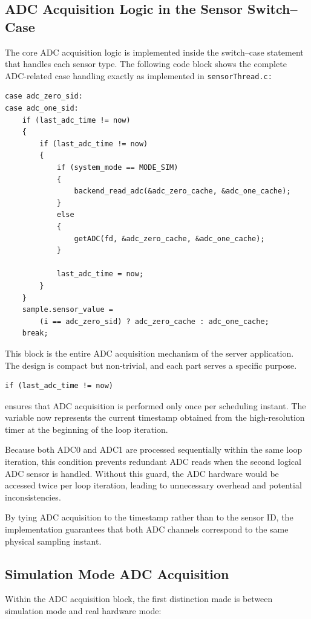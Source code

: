 \subsection{ADC Acquisition Logic in the Sensor Switch–Case}
The core ADC acquisition logic is implemented inside the switch–case statement that handles each sensor type. The following code block shows the complete ADC-related case handling exactly as implemented in \texttt{sensorThread.c:}

\begin{verbatim}
case adc_zero_sid:
case adc_one_sid:
    if (last_adc_time != now)
    {
        if (last_adc_time != now)
        {
            if (system_mode == MODE_SIM)
            {
                backend_read_adc(&adc_zero_cache, &adc_one_cache);
            }
            else
            {
                getADC(fd, &adc_zero_cache, &adc_one_cache);
            }

            last_adc_time = now;
        }
    }
    sample.sensor_value =
        (i == adc_zero_sid) ? adc_zero_cache : adc_one_cache;
    break;
\end{verbatim}
This block is the entire ADC acquisition mechanism of the server application. The design is compact but non-trivial, and each part serves a specific purpose.

\begin{verbatim}
if (last_adc_time != now)
\end{verbatim}

ensures that ADC acquisition is performed only once per scheduling instant. The variable now represents the current timestamp obtained from the high-resolution timer at the beginning of the loop iteration.

Because both ADC0 and ADC1 are processed sequentially within the same loop iteration, this condition prevents redundant ADC reads when the second logical ADC sensor is handled. Without this guard, the ADC hardware would be accessed twice per loop iteration, leading to unnecessary overhead and potential inconsistencies.

By tying ADC acquisition to the timestamp rather than to the sensor ID, the implementation guarantees that both ADC channels correspond to the same physical sampling instant.

\subsection{Simulation Mode ADC Acquisition}
Within the ADC acquisition block, the first distinction made is between simulation mode and real hardware mode:
